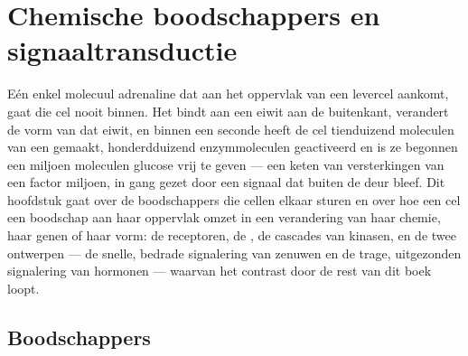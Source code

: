 \chapter{Chemische boodschappers en signaaltransductie}\label{ch:b2:cell-signalling}

Eén enkel molecuul adrenaline dat aan het oppervlak van een levercel
aankomt, gaat die cel nooit binnen. Het bindt aan een eiwit aan de
buitenkant, verandert de vorm van dat eiwit, en binnen een seconde heeft
de cel tienduizend moleculen van een  gemaakt,
honderdduizend enzymmoleculen geactiveerd en is ze begonnen een miljoen
moleculen glucose vrij te geven --- een keten van versterkingen van een
factor miljoen, in gang gezet door een signaal dat buiten de deur bleef. Dit
hoofdstuk gaat over de boodschappers die cellen elkaar sturen en over hoe een
cel een boodschap aan haar oppervlak omzet in een verandering van haar
chemie, haar genen of haar vorm: de receptoren, de , de cascades van kinasen, en de twee ontwerpen --- de snelle,
bedrade signalering van zenuwen en de trage, uitgezonden signalering van
hormonen --- waarvan het contrast door de rest van dit boek loopt.

\section{Boodschappers}

